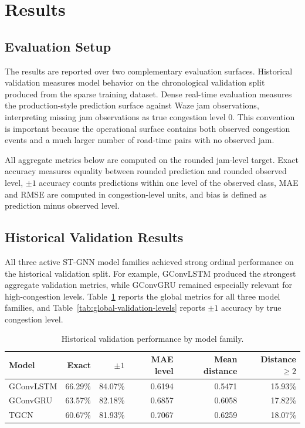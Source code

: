 \documentclass[11pt, a4paper]{article}
\begin{document}
\section{Results}

\subsection{Evaluation Setup}

The results are reported over two complementary evaluation surfaces. Historical validation measures model behavior on the chronological validation split produced from the sparse training dataset. Dense real-time evaluation measures the production-style prediction surface against Waze jam observations, interpreting missing jam observations as true congestion level 0. This convention is important because the operational surface contains both observed congestion events and a much larger number of road-time pairs with no observed jam.

All aggregate metrics below are computed on the rounded jam-level target. Exact accuracy measures equality between rounded prediction and rounded observed level, $\pm1$ accuracy counts predictions within one level of the observed class, MAE and RMSE are computed in congestion-level units, and bias is defined as prediction minus observed level.

\subsection{Historical Validation Results}

All three active ST-GNN model families achieved strong ordinal performance on the historical validation split. For example, GConvLSTM produced the strongest aggregate validation metrics, while GConvGRU remained especially relevant for high-congestion levels. Table~\ref{tab:global-validation-summary} reports the global metrics for all three model families, and Table~\ref{tab:global-validation-levels} reports $\pm1$ accuracy by true congestion level.

\begin{table}[htbp]
\centering
\caption{Historical validation performance by model family.}
\label{tab:global-validation-summary}
{%
\begin{tabular}{lrrrrr}
\hline
Model & Exact & $\pm1$ & MAE level & Mean distance & Distance $\ge2$ \\
\hline
GConvLSTM & 66.29\% & 84.07\% & 0.6194 & 0.5471 & 15.93\% \\
GConvGRU & 63.57\% & 82.18\% & 0.6857 & 0.6058 & 17.82\% \\
TGCN & 60.67\% & 81.93\% & 0.7067 & 0.6259 & 18.07\% \\
\hline
\end{tabular}%
}
\end{table}
\end{document}
